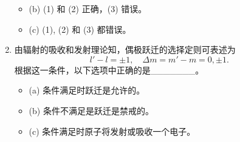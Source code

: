 \begin{enumerate}
\begin{itemize}
        \item (b) (1) 和 (2) 正确，(3) 错误。
        \item (c) (1), (2) 和 (3) 都错误。
    \end{itemize}
    \item 由辐射的吸收和发射理论知，偶极跃迁的选择定则可表述为\[
l' - l = \pm1, \quad \Delta m = m' - m = 0, \pm1.~\]
根据这一条件，以下选项中正确的是_______。
     \begin{itemize}
        \item (a) 条件满足时跃迁是允许的。
        \item (b) 条件不满足是跃迁是禁戒的。
        \item (c) 条件满足时原子将发射或吸收一个电子。
    \end{itemize}
\end{enumerate}

